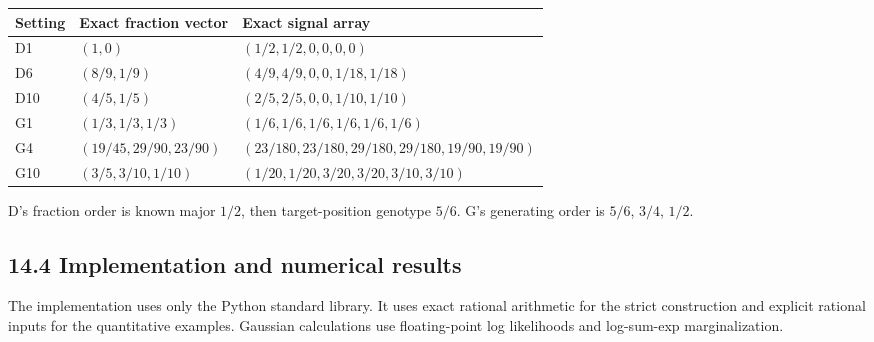 \documentclass[
]{article}
\newcounter{none} %
\begin{document}
{\def\LTcaptype{none} %
\begin{longtable}[]{@{}
  >{\raggedright\arraybackslash}p{}
  >{\raggedright\arraybackslash}p{}
  >{\raggedright\arraybackslash}p{}@{}}
\toprule\noalign{}
\begin{minipage}[b]{\linewidth}\raggedright
Setting
\end{minipage} & \begin{minipage}[b]{\linewidth}\raggedright
Exact fraction vector
\end{minipage} & \begin{minipage}[b]{\linewidth}\raggedright
Exact signal array
\end{minipage} \\
\midrule\noalign{}
\endhead
\bottomrule\noalign{}
\endlastfoot
D1 & \((1,0)\) & \((1/2,1/2,0,0,0,0)\) \\
D6 & \((8/9,1/9)\) & \((4/9,4/9,0,0,1/18,1/18)\) \\
D10 & \((4/5,1/5)\) & \((2/5,2/5,0,0,1/10,1/10)\) \\
G1 & \((1/3,1/3,1/3)\) & \((1/6,1/6,1/6,1/6,1/6,1/6)\) \\
G4 & \((19/45,29/90,23/90)\) &
\((23/180,23/180,29/180,29/180,19/90,19/90)\) \\
G10 & \((3/5,3/10,1/10)\) & \((1/20,1/20,3/20,3/20,3/10,3/10)\) \\
\end{longtable}
}

D's fraction order is known major \(1/2\), then target-position genotype
\(5/6\). G's generating order is \(5/6\), \(3/4\), \(1/2\).

\subsection{14.4 Implementation and numerical
results}\label{implementation-and-numerical-results}

The implementation uses only the Python standard library. It uses exact
rational arithmetic for the strict construction and explicit rational
inputs for the quantitative examples. Gaussian calculations use
floating-point log likelihoods and log-sum-exp marginalization.
\end{document}
